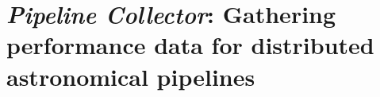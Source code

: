 

\chapter[Pipeline Collector]{\textit{Pipeline Collector}: Gathering performance data for distributed astronomical pipelines}\label{ch:pipeline_collector}
\setcounter{footnote}{0}

\author{Alexandar P. Mechev$^a$ }

\author{Aske Plaat$^b$}%
\author{J.B. Raymond Oonk$^a$$^,$$^c$}%
\author{Huib T. Intema$^a$}%
\author{Huub J.A. R\"ottgering$^a$}%

\date{\today}%

